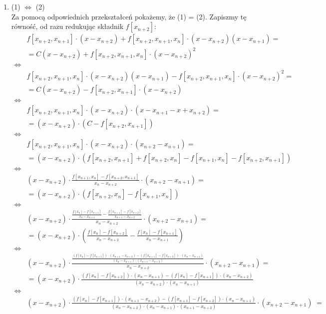 \documentclass[12pt]{article}
\newcommand{\0}{x_{n}}
\newcommand{\1}{x_{n+1}}
\newcommand{\2}{x_{n+2}}
\newcommand{\3}{x_{n+3}}
\begin{document}
\begin{enumerate}[1.]
\begin{enumerate}[$\bullet$]
\item (1) $\Leftrightarrow$ (2) \medskip \\
Za pomocą odpowiednich przekształceń pokażemy, że (1) = (2). Zapiszmy tę równość, od razu redukując składnik $f[\2]$:
\begin{align*}
&f[\2,\1] \cdot (x - \2) + f[\2, \1, \0] \cdot (x - \2)(x - \1) = \\[1ex]
&= C(x - \2) + f[\2, \1, \0] \cdot (x - \2)^2 \\
\Leftrightarrow & \\
&f[\2, \1, \0] \cdot (x - \2)(x - \1) - f[\2, \1, \0] \cdot (x - \2)^2 = \\[1ex]
&= C(x - \2) - f[\2,\1] \cdot (x - \2) \\
\Leftrightarrow & \\
&f[\2, \1, \0] \cdot (x - \2) \cdot \left( x - \1 - x + \2 \right) = \\[1ex]
&= (x - \2) \cdot \left( C - f[\2, \1] \right) \\
\Leftrightarrow & \\
&f[\2, \1, \0] \cdot (x - \2) \cdot (\2 - \1) = \\[1ex]
&= (x - \2) \cdot \left(f[\2, \1] + f[\2, \0] - f[\1, \0] - f[\2, \1] \right) \\
\Leftrightarrow & \\
& (x - \2) \cdot \frac{f[\1, \0] - f[\2, \1]}{\0 - \2} \cdot (\2 - \1) = \\[1ex]
&= (x - \2) \cdot \left(f[\2, \0] - f[\1, \0]\right) \\
\Leftrightarrow & \\
& (x - \2) \cdot \frac{\frac{f[\0] - f[\1]}{\0 - \1} - \frac{f[\1] - f[\2]}{\1 - \2}}{\0 - \2} \cdot (\2 - \1) = \\[1ex]
&= (x - \2) \cdot \left(\frac{f[\0] - f[\2]}{\0 - \2} - \frac{f[\0] - f[\1]}{\0 - \1} \right) \\
\Leftrightarrow & \\
& (x - \2) \cdot \frac{\frac{(f[\0] - f[\1]) \cdot (\1 - \2) - (f[\1] - f[\2]) \cdot (\0 - \1)}{(\0 - \1) \cdot (\1 - \2)}}{\0 - \2} \cdot (\2 - \1) = \\[1ex]
&= (x - \2) \cdot \frac{(f[\0] - f[\2]) \cdot (\0 - \1) - (f[\0] - f[\1]) \cdot (\0 - \2)}{(\0 - \2) \cdot (\0 - \1)} \\
\Leftrightarrow & \\
& \scriptstyle (x - \2) \cdot \frac{(f[\0] - f[\1]) \cdot (\1 - \2) - (f[\1] - f[\2]) \cdot (\0 - \1)}{(\0 - \2) \cdot (\0 - \1) \cdot (\1 - \2)} \cdot (\2 - \1) \; = \\[1ex]

\end{align*}
\end{enumerate}
\end{enumerate}
\end{document}
